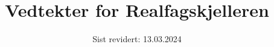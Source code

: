 \documentclass[titlepage]{article} %
\begin{document}
\begin{titlepage}
    \title{\huge{\textbf{Vedtekter for Realfagskjelleren}}}
    \date{Sist revidert: 13.03.2024}
    \titlepic{}
    \maketitle
\end{titlepage}
\clearpage
\setcounter{page}{1}

\tableofcontents
\newpage











\end{document}
